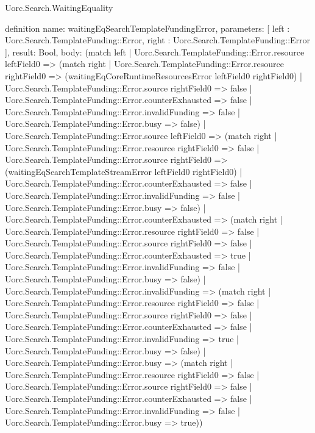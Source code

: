 \begin{lexlean}{Uorc.Search.WaitingEquality}
\begin{semanticmodule}
definition{
  name: waitingEqSearchTemplateFundingError,
  parameters: [
    left : Uorc.Search.TemplateFunding::Error,
    right : Uorc.Search.TemplateFunding::Error
  ],
  result: Bool,
  body: (match left
    | Uorc.Search.TemplateFunding::Error.resource leftField0 => (match right
      | Uorc.Search.TemplateFunding::Error.resource rightField0 => (waitingEqCoreRuntimeResourcesError leftField0 rightField0)
      | Uorc.Search.TemplateFunding::Error.source rightField0 => false
      | Uorc.Search.TemplateFunding::Error.counterExhausted => false
      | Uorc.Search.TemplateFunding::Error.invalidFunding => false
      | Uorc.Search.TemplateFunding::Error.busy => false)
    | Uorc.Search.TemplateFunding::Error.source leftField0 => (match right
      | Uorc.Search.TemplateFunding::Error.resource rightField0 => false
      | Uorc.Search.TemplateFunding::Error.source rightField0 => (waitingEqSearchTemplateStreamError leftField0 rightField0)
      | Uorc.Search.TemplateFunding::Error.counterExhausted => false
      | Uorc.Search.TemplateFunding::Error.invalidFunding => false
      | Uorc.Search.TemplateFunding::Error.busy => false)
    | Uorc.Search.TemplateFunding::Error.counterExhausted => (match right
      | Uorc.Search.TemplateFunding::Error.resource rightField0 => false
      | Uorc.Search.TemplateFunding::Error.source rightField0 => false
      | Uorc.Search.TemplateFunding::Error.counterExhausted => true
      | Uorc.Search.TemplateFunding::Error.invalidFunding => false
      | Uorc.Search.TemplateFunding::Error.busy => false)
    | Uorc.Search.TemplateFunding::Error.invalidFunding => (match right
      | Uorc.Search.TemplateFunding::Error.resource rightField0 => false
      | Uorc.Search.TemplateFunding::Error.source rightField0 => false
      | Uorc.Search.TemplateFunding::Error.counterExhausted => false
      | Uorc.Search.TemplateFunding::Error.invalidFunding => true
      | Uorc.Search.TemplateFunding::Error.busy => false)
    | Uorc.Search.TemplateFunding::Error.busy => (match right
      | Uorc.Search.TemplateFunding::Error.resource rightField0 => false
      | Uorc.Search.TemplateFunding::Error.source rightField0 => false
      | Uorc.Search.TemplateFunding::Error.counterExhausted => false
      | Uorc.Search.TemplateFunding::Error.invalidFunding => false
      | Uorc.Search.TemplateFunding::Error.busy => true))
}


\end{semanticmodule}
\end{lexlean}
